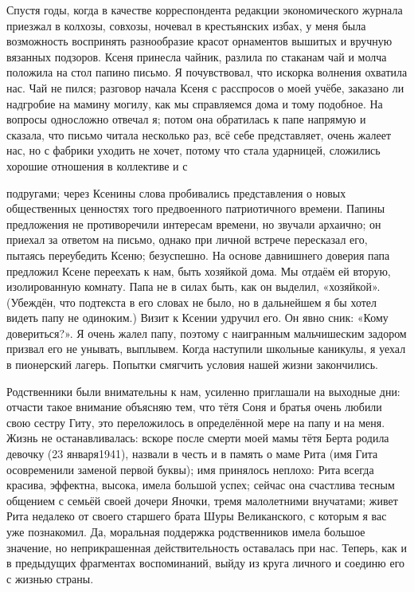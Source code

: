\label{195-1}
Спустя годы, когда в качестве корреспондента редакции экономического журнала приезжал в колхозы, совхозы, ночевал в крестьянских избах, у меня была возможность воспринять разнообразие красот орнаментов вышитых и вручную вязанных подзоров. Ксеня принесла чайник, разлила по стаканам чай и молча положила на стол папино письмо. Я почувствовал, что искорка волнения охватила нас. Чай не пился; разговор начала Ксеня с расспросов о моей учёбе, заказано ли надгробие на мамину могилу, как мы справляемся дома и тому подобное. На вопросы односложно отвечал я; потом она обратилась к папе напрямую и сказала, что письмо читала несколько раз, всё себе представляет, очень жалеет нас, но с фабрики уходить не хочет, потому что стала ударницей, сложились хорошие отношения в коллективе и с 

\label{196-1}
подругами; через Ксенины слова пробивались представления о новых общественных ценностях того предвоенного патриотичного времени. Папины предложения не противоречили интересам времени, но звучали архаично; он приехал за ответом на письмо, однако при личной встрече пересказал его, пытаясь переубедить Ксеню; безуспешно. На основе давнишнего доверия папа предложил Ксене переехать к нам, быть хозяйкой дома. Мы отдаём ей вторую, изолированную комнату. Папа не в силах быть, как он выделил, «хозяйкой». (Убеждён, что подтекста в его словах не было, но в дальнейшем я бы хотел видеть папу не одиноким.) Визит к Ксении удручил его. Он явно сник: «Кому довериться?». Я очень жалел папу, поэтому с наигранным мальчишеским задором призвал его не унывать, выплывем. Когда наступили школьные каникулы, я уехал в пионерский лагерь. Попытки смягчить условия нашей жизни закончились.

\label{197-1}
 Родственники были внимательны к нам, усиленно приглашали на выходные дни: отчасти такое внимание объясняю тем, что тётя Соня и братья очень любили свою сестру Гиту, это переложилось в определённой мере на папу и на меня. Жизнь не останавливалась: вскоре после смерти моей мамы тётя Берта родила девочку (23 января1941), назвали в честь и в память о маме Рита (имя Гита осовременили заменой первой буквы); имя принялось неплохо: Рита всегда красива, эффектна, высока, имела большой успех; сейчас она счастлива тесным общением с семьёй своей дочери Яночки, тремя малолетними внучатами; живет Рита недалеко от своего старшего брата Шуры Великанского, с которым я вас уже познакомил. Да, моральная поддержка родственников имела большое значение, но неприкрашенная действительность оставалась при нас.
Теперь, как и в предыдущих фрагментах воспоминаний, выйду из круга личного и соединю его с жизнью страны.